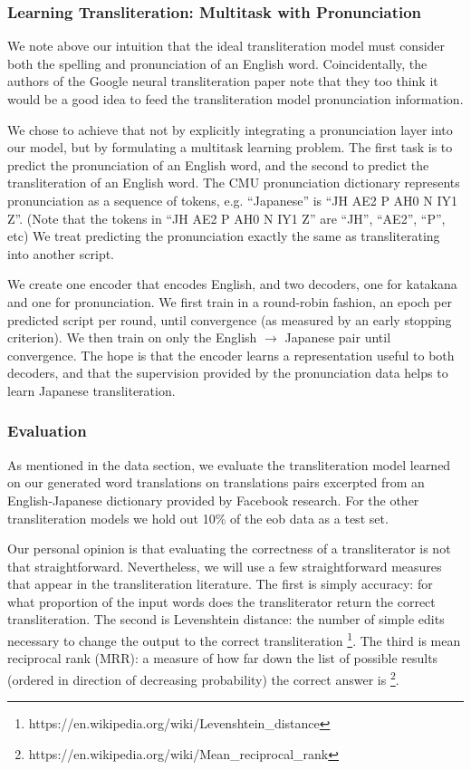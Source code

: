 \documentclass{article}
\begin{document}
\subsubsection*{Learning Transliteration: Multitask with Pronunciation}

We note above our intuition that the ideal transliteration model
must consider both the spelling and pronunciation of an English word.
Coincidentally,
the authors of the Google neural transliteration paper
\cite{Rosca2016SequencetosequenceNN}
note that they too think it would be a good idea
to feed the transliteration model pronunciation information.

We chose to achieve that not by
explicitly integrating a pronunciation layer into our model,
but by formulating a multitask learning problem.
The first task is to predict the pronunciation of an English word,
and the second to predict the transliteration of an English word.
The CMU pronunciation dictionary represents pronunciation
as a sequence of tokens,
e.g. ``Japanese'' is ``JH AE2 P AH0 N IY1 Z''.
(Note that the tokens in ``JH AE2 P AH0 N IY1 Z''
are ``JH'', ``AE2'', ``P'', etc)
We treat predicting the pronunciation exactly the same as
transliterating into another script.

We create one encoder that encodes English,
and two decoders, one for katakana and one for pronunciation.
We first train in a round-robin fashion,
an epoch per predicted script per round,
until convergence (as measured by an early stopping criterion).
We then train on only the English $\rightarrow$ Japanese pair
until convergence.
The hope is that the encoder learns a representation useful to both decoders,
and that the supervision provided by the pronunciation data
helps to learn Japanese transliteration.

\subsubsection*{Evaluation}

As mentioned in the data section,
we evaluate the transliteration model learned on our generated word translations
on translations pairs excerpted from an English-Japanese dictionary
provided by Facebook research.
For the other transliteration models
we hold out 10\% of the eob data as a test set.

Our personal opinion is that evaluating the correctness
of a transliterator is not that straightforward.
Nevertheless,
we will use a few straightforward measures
that appear in the transliteration literature.
The first is simply accuracy:
for what proportion of the input words
does the transliterator return the correct transliteration.
The second is Levenshtein distance:
the number of simple edits necessary to change the output to
the correct transliteration
\footnote{https://en.wikipedia.org/wiki/Levenshtein\_distance}.
The third is mean reciprocal rank (MRR):
a measure of how far down the list of possible results
(ordered in direction of decreasing probability)
the correct answer is
\footnote{https://en.wikipedia.org/wiki/Mean\_reciprocal\_rank}.
\end{document}
